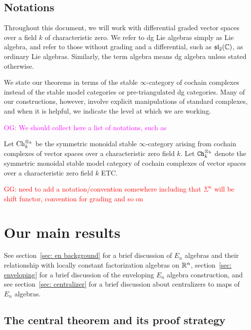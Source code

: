 \documentclass[11pt]{amsart}
\numberwithin{equation}{section}
\def\owen{\textcolor{magenta}{OG: }\textcolor{magenta}}
\def\greg{\textcolor{red}{GG: }\textcolor{red}}
\begin{document}
\subsection{Notations}

\begin{rmk}
Throughout this document, we will work with differential graded vector spaces over a field $k$ of characteristic zero. We refer to dg Lie algebras simply as Lie algebra, and refer to those without grading and a differential, such as $\frak{sl}_2(\mathbb C)$, as ordinary Lie algebras. Similarly, the term algebra means dg algebra unless stated otherwise.
\end{rmk}

\begin{rmk}
We state our theorems in terms of the stable $\infty$-category of cochain complexes 
instead of the stable model categories or pre-triangulated dg categories. 
Many of our constructions, however, involve explicit manipulations of standard complexes, 
and when it is helpful, we indicate the level at which we are working.
\end{rmk}

\owen{We should collect here a list of notations, such as}

Let ${\rm Ch}_k^{\otimes_k}$ be the symmetric monoidal stable $\infty$-category arising from cochain complexes of vector spaces over a characteristic zero field $k$.
Let ${\tt Ch}_k^{\otimes_k}$ denote the symmetric monoidal stable model category of cochain complexes of vector spaces over a characteristic zero field $k$ ETC.

\greg{need to add a notation/convention somewhere including that $\Sigma^n$ will be shift functor, convention for grading and so on}

\section{Our main results}

See section~\ref{sec: en background} for a brief discussion of $E_n$ algebras and their relationship with locally constant factorization algebras on $\mathbb R^n$, section~\ref{sec: enveloping} for a brief discussion of the enveloping $E_n$ algebra construction, and see section~\ref{sec: centralizer} 
for a brief discussion about centralizers to maps of $E_n$ algebras.

\subsection{The central theorem and its proof strategy}
\end{document}
